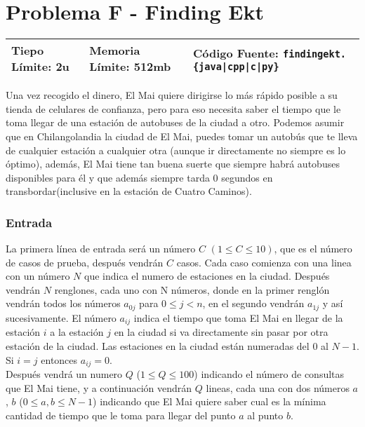 \chapter*{Problema F - Finding Ekt}

\begin{center}
  \begin{tabular}{ | l | l | l | }
    \hline
   Tiepo Límite: 2u & Memoria Límite: 512mb & Código Fuente: \texttt{findingekt.\{java|cpp|c|py\}} \\
    \hline
  \end{tabular}
\end{center}

Una vez recogido el dinero, El Mai quiere dirigirse lo más rápido posible a su tienda de celulares de confianza, pero para eso necesita saber el tiempo que le toma llegar de una estación de autobuses de la ciudad a otro. Podemos asumir que en Chilangolandia la ciudad de El Mai, puedes tomar un autobús que te lleva de cualquier estación a cualquier otra (aunque ir directamente no siempre es lo óptimo), además, El Mai tiene tan buena suerte que siempre habrá autobuses disponibles para él y que además siempre tarda $0$ segundos en transbordar(inclusive en la estación de Cuatro Caminos).

\subsection*{Entrada}

La primera línea de entrada será un número $C$ $(1 \leq  C\leq 10)$, que es el número de casos de prueba, después vendrán $C$ casos. Cada caso comienza con una linea con un número $N$ que indica el numero de estaciones en la ciudad. Después vendrán $N$ renglones, cada uno con N números, donde en la primer renglón vendrán todos los números $a_{0j}$ para $0 \leq j < n$, en el segundo vendrán $a_{1j}$ y así sucesivamente. El número $a_{ij}$ indica el tiempo que toma El Mai en llegar de la estación $i$ a la estación $j$ en la ciudad si  va directamente sin pasar por otra estación de la ciudad. Las estaciones en la ciudad están numeradas del $0$ al $N-1$.  Si $i=j$ entonces $a_{ij}=0$. \\
Después vendrá un numero $Q$ ($1\leq Q \leq 100$) indicando el número de consultas que El Mai tiene, y a continuación vendrán $Q$ lineas, cada una con dos números $a$, $b$ ($0 \leq a, b \leq N-1$) indicando que El Mai quiere saber cual es la mínima cantidad de tiempo que le toma para llegar del punto $a$ al punto $b$.


